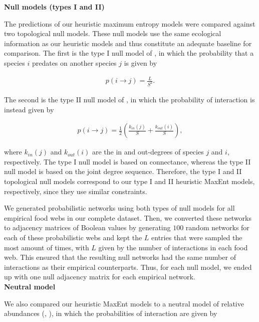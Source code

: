 \begin{box3.2}

\textbf{Null models (types I and II)}

The predictions of our heuristic maximum entropy models were compared against
two topological null models. These null models use the same ecological
information as our heuristic models and thus constitute an adequate baseline for
comparison. The first is the type I null model of \textcite{Fortuna2006Habitat}, in
which the probability that a species $i$ predates on another species $j$ is
given by
  
\begin{eqnarray}
\label{eq:type1null}
    p(i \rightarrow j) = \frac{L}{S^2}.
\end{eqnarray}
  
The second is the type II null model of \textcite{Bascompte2003Nested}, in which
the probability of interaction is instead given by 
  
\begin{eqnarray}
\label{eq:type2null}
    p(i \rightarrow j) = \frac{1}{2} \left(\frac{k_{in}(j)}{S} +
    \frac{k_{out}(i)}{S}\right),
\end{eqnarray}
  
where $k_{in}(j)$ and $k_{out}(i)$ are the in and out-degrees of species $j$ and
$i$, respectively. The type I null model is based on connectance, whereas the
type II null model is based on the joint degree sequence. Therefore, the type I
and II topological null models correspond to our type I and II heuristic MaxEnt
models, respectively, since they use similar constraints. 
  
We generated probabilistic networks using both types of null models for all
empirical food webs in our complete dataset. Then, we converted these networks
to adjacency matrices of Boolean values by generating $100$ random networks for
each of these probabilistic webs and kept the $L$ entries that were sampled the
most amount of times, with $L$ given by the number of interactions in each food
web. This ensured that the resulting null networks had the same number of
interactions as their empirical counterparts. Thus, for each null model, we
ended up with one null adjacency matrix for each empirical network. \\

\textbf{Neutral model}
  
We also compared our heuristic MaxEnt models to a neutral model of relative
abundances (\cite{Krishna2008Neutralniche}, \cite{Canard2012Emergence}), in
which the probabilities of interaction are given by
  

\end{box3.2}
